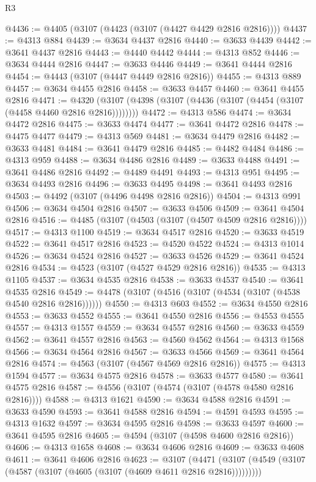 \begin{lexlean}{R3}
\begin{coremodule}
@4436 := @4405 (@3107 (@4423 (@3107 (@4427 @4429 @2816 @2816))))
@4437 := @4313 @884
@4439 := @3634 @4437 @2816
@4440 := @3633 @4439
@4442 := @3641 @4437 @2816
@4443 := @4440 @4442
@4444 := @4313 @852
@4446 := @3634 @4444 @2816
@4447 := @3633 @4446
@4449 := @3641 @4444 @2816
@4454 := @4443 (@3107 (@4447 @4449 @2816 @2816))
@4455 := @4313 @889
@4457 := @3634 @4455 @2816
@4458 := @3633 @4457
@4460 := @3641 @4455 @2816
@4471 := @4320 (@3107 (@4398 (@3107 (@4436 (@3107 (@4454 (@3107 (@4458 @4460 @2816 @2816))))))))
@4472 := @4313 @586
@4474 := @3634 @4472 @2816
@4475 := @3633 @4474
@4477 := @3641 @4472 @2816
@4478 := @4475 @4477
@4479 := @4313 @569
@4481 := @3634 @4479 @2816
@4482 := @3633 @4481
@4484 := @3641 @4479 @2816
@4485 := @4482 @4484
@4486 := @4313 @959
@4488 := @3634 @4486 @2816
@4489 := @3633 @4488
@4491 := @3641 @4486 @2816
@4492 := @4489 @4491
@4493 := @4313 @951
@4495 := @3634 @4493 @2816
@4496 := @3633 @4495
@4498 := @3641 @4493 @2816
@4503 := @4492 (@3107 (@4496 @4498 @2816 @2816))
@4504 := @4313 @991
@4506 := @3634 @4504 @2816
@4507 := @3633 @4506
@4509 := @3641 @4504 @2816
@4516 := @4485 (@3107 (@4503 (@3107 (@4507 @4509 @2816 @2816))))
@4517 := @4313 @1100
@4519 := @3634 @4517 @2816
@4520 := @3633 @4519
@4522 := @3641 @4517 @2816
@4523 := @4520 @4522
@4524 := @4313 @1014
@4526 := @3634 @4524 @2816
@4527 := @3633 @4526
@4529 := @3641 @4524 @2816
@4534 := @4523 (@3107 (@4527 @4529 @2816 @2816))
@4535 := @4313 @1105
@4537 := @3634 @4535 @2816
@4538 := @3633 @4537
@4540 := @3641 @4535 @2816
@4549 := @4478 (@3107 (@4516 (@3107 (@4534 (@3107 (@4538 @4540 @2816 @2816))))))
@4550 := @4313 @603
@4552 := @3634 @4550 @2816
@4553 := @3633 @4552
@4555 := @3641 @4550 @2816
@4556 := @4553 @4555
@4557 := @4313 @1557
@4559 := @3634 @4557 @2816
@4560 := @3633 @4559
@4562 := @3641 @4557 @2816
@4563 := @4560 @4562
@4564 := @4313 @1568
@4566 := @3634 @4564 @2816
@4567 := @3633 @4566
@4569 := @3641 @4564 @2816
@4574 := @4563 (@3107 (@4567 @4569 @2816 @2816))
@4575 := @4313 @1594
@4577 := @3634 @4575 @2816
@4578 := @3633 @4577
@4580 := @3641 @4575 @2816
@4587 := @4556 (@3107 (@4574 (@3107 (@4578 @4580 @2816 @2816))))
@4588 := @4313 @1621
@4590 := @3634 @4588 @2816
@4591 := @3633 @4590
@4593 := @3641 @4588 @2816
@4594 := @4591 @4593
@4595 := @4313 @1632
@4597 := @3634 @4595 @2816
@4598 := @3633 @4597
@4600 := @3641 @4595 @2816
@4605 := @4594 (@3107 (@4598 @4600 @2816 @2816))
@4606 := @4313 @1658
@4608 := @3634 @4606 @2816
@4609 := @3633 @4608
@4611 := @3641 @4606 @2816
@4623 := @3107
    (@4471 (@3107 (@4549 (@3107 (@4587 (@3107 (@4605 (@3107 (@4609 @4611 @2816 @2816)))))))))

\end{coremodule}
\end{lexlean}
